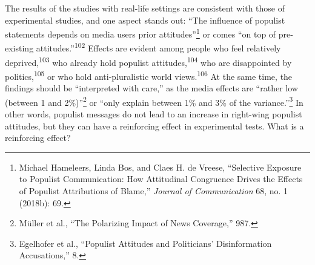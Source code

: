 \documentclass{tufte-handout}
\begin{document}
{{The results of the studies with real-life settings are consistent with
those of experimental studies, and one aspect stands out: ``The
influence of populist statements depends on media
users\textquotesingle{} prior attitudes''\footnote{Michael Hameleers,
  Linda Bos, and Claes H. de Vreese, ``Selective Exposure to Populist
  Communication: How Attitudinal Congruence Drives the Effects of
  Populist Attributions of Blame,'' \emph{Journal of Communication} 68,
  no. 1 (2018b): 69.} or comes ``on top of pre-existing
attitudes.''\textsuperscript{102}
Effects are evident among people who feel relatively
deprived,\textsuperscript{103} who already hold populist attitudes,\textsuperscript{104} who
are disappointed by politics,\textsuperscript{105} or who
hold anti-pluralistic world views.\textsuperscript{106} At the same time, the findings
should be ``interpreted with care,'' as the media effects are ``rather
low (between 1 and 2\%)''\footnote{Müller et al., ``The Polarizing Impact
  of News Coverage,'' 987.} or ``only explain between 1\% and 3\% of the
variance.''\footnote{Egelhofer et al., ``Populist Attitudes and
  Politicians' Disinformation Accusations,'' 8.} In other words,
populist messages do not lead to an increase in right-wing populist
attitudes, but they can have a reinforcing effect in experimental tests.
What is a reinforcing effect?

}}
\end{document}
